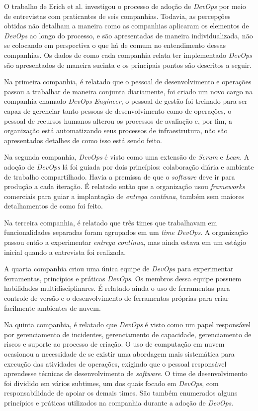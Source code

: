 {O trabalho de Erich et al. \cite{qualitative_devops_journalsw_17} investigou
o processo de adoção de \textit{DevOps} por meio de entrevistas com praticantes
de seis companhias. Todavia, as percepções obtidas não detalham a maneira como
as companhias aplicaram os elementos de \textit{DevOps} ao longo do processo,
e são apresentadas de maneira individualizada, não se colocando em perspectiva
o que há de comum no entendimento dessas companhias. Os dados de como cada
companhia relata ter implementado \textit{DevOps} são apresentados de maneira
sucinta e os principais pontos são descritos a seguir.

Na primeira companhia, é relatado que o pessoal de desenvolvimento e
operações passou a trabalhar de maneira conjunta diariamente, foi criado um
novo cargo na companhia chamado \textit{DevOps Engineer}, o pessoal de gestão
foi treinado para ser capaz de gerenciar tanto pessoas de desenvolvimento como
de operações, o pessoal de recursos humanos alterou os processos de avaliação e,
por fim, a organização está automatizando seus processos de infraestrutura, não
são apresentados detalhes de como isso está sendo feito.

Na segunda companhia, \textit{DevOps} é visto como uma extensão de
\textit{Scrum} e \textit{Lean}. A adoção de \textit{DevOps} lá foi guiada por
dois princípios: colaboração diária e ambiente de trabalho compartilhado.
Havia a premissa de que o \textit{software} deve ir para produção a cada
iteração. É relatado então que a organização usou \textit{frameworks}
comerciais para guiar a implantação de \emph{entrega contínua}, também sem maiores
detalhamentos de como foi feito.

Na terceira companhia, é relatado que três times que trabalhavam em
funcionalidades separadas foram agrupados em um \emph{time DevOps}. A organização
passou então a experimentar \textit{entrega contínua}, mas ainda estava em
um estágio inicial quando a entrevista foi realizada.

A quarta companhia criou uma única equipe de \textit{DevOps} para
experimentar ferramentas, princípios e práticas \textit{DevOps}. Os
membros dessa equipe possuem habilidades multidisciplinares. É relatado ainda
o uso de ferramentas para controle de versão e o desenvolvimento de ferramentas
próprias para criar facilmente ambientes de nuvem.

Na quinta companhia, é relatado que \textit{DevOps} é visto como
um papel responsável por gerenciamento de incidentes, gerenciamento de
capacidade, gerenciamento de riscos e suporte ao processo de criação.
O uso de computação em nuvem ocasionou a necessidade de se existir uma
abordagem mais sistemática para execução das atividades de operações, exigindo
que o pessoal responsável aprendesse técnicas de desenvolvimento de
\textit{software}. O time de desenvolvimento foi dividido em vários subtimes,
um dos quais focado em \textit{DevOps}, com responsabilidade de apoiar os demais
times. São também enumerados alguns princípios e práticas utilizados na companhia
durante a adoção de \textit{DevOps}.

}
